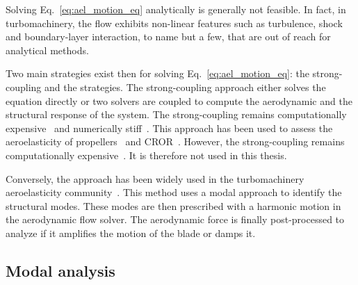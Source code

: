 
Solving Eq.~\eqref{eq:ael_motion_eq} analytically is generally 
not feasible. In fact, in turbomachinery, 
the flow exhibits non-linear features such as turbulence, shock and
boundary-layer interaction, to name but a few, that are out of reach for
analytical methods.

Two main strategies exist then for solving Eq.~\eqref{eq:ael_motion_eq}:
the strong-coupling and the  strategies. The strong-coupling 
approach either solves the equation directly or two solvers are coupled to 
compute the aerodynamic and the structural response of the system.
The strong-coupling remains computationally expensive~\cite{Bartels2007}
and numerically stiff~\cite{Datta2008}. This approach
has been used to assess the
aeroelasticity of propellers~\cite{Ruiz-Calavera2012} and
CROR~\cite{Laban2010}. However, 
the strong-coupling remains 
computationally expensive~\cite{Bartels2007}.
It is therefore not used in this thesis.

Conversely, the  approach has been widely used
in the turbomachinery aeroelasticity community~\cite{Marshall1996}.
This method uses a modal approach to identify the structural modes.
These modes are then prescribed with a harmonic motion in the aerodynamic
flow solver. The aerodynamic force is finally post-processed to 
analyze if it amplifies the motion of the blade or damps it.

\subsection{Modal analysis}
\label{sub:modal_analysis}

